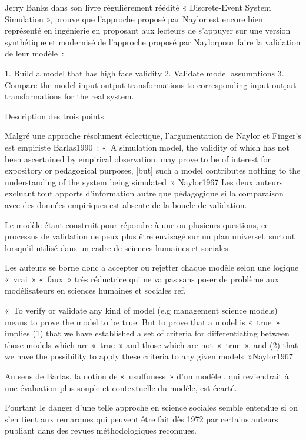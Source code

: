 Jerry Banks dans son livre régulièrement réédité « Discrete-Event System Simulation », prouve que l'approche proposé par Naylor est encore bien représenté en ingénierie en proposant aux lecteurs de s'appuyer sur une version synthétique et modernisé de l'approche proposé par Naylorpour faire la validation de leur modèle : 

1. Build a model that has high face validity
2. Validate model assumptions
3. Compare the model input-output transformations to corresponding input-output transformations for the real system.

{Description des trois points}

Malgré une approche résolument éclectique, l'argumentation de Naylor et Finger's est  empiriste {Barlas1990} : « A simulation model, the validity of which has not been ascertained by empirical observation, may prove to be of interest for expository or pedagogical purposes, [but] such a model contributes  nothing to the understanding of the system being simulated » {Naylor1967} Les deux auteurs excluant tout apports d'information autre que pédagogique si la comparaison avec des données empiriques est absente de la boucle de validation.

Le modèle étant construit pour répondre à une ou plusieurs questions, ce processus de validation ne peux plus être envisagé sur un plan universel, surtout lorsqu'il utilisé dans un cadre de sciences humaines et sociales. 

Les auteurs se borne donc a accepter ou rejetter chaque modèle selon une logique « vrai » « faux » très réductrice qui ne va pas sans poser de problème aux modélisateurs en sciences humaines et sociales {ref}.

« To verify or validate any kind of model (e.g management science models) means to prove the model to be true. But to prove that a model is « true » implies (1) that we have established a set of criteria for differentiating between those models which are « true » and those which are not « true », and (2) that we have the possibility to apply these criteria to any given models »{Naylor1967}

 Au sens de Barlas, la notion de « usulfuness » d'un modèle , qui reviendrait à une évaluation plus souple et contextuelle du modèle, est écarté. 

Pourtant le danger d'une telle approche en science sociales semble entendue si on s'en tient aux remarques qui peuvent être fait dès 1972 par certains auteurs publiant dans des revues méthodologiques reconnues. 
 
